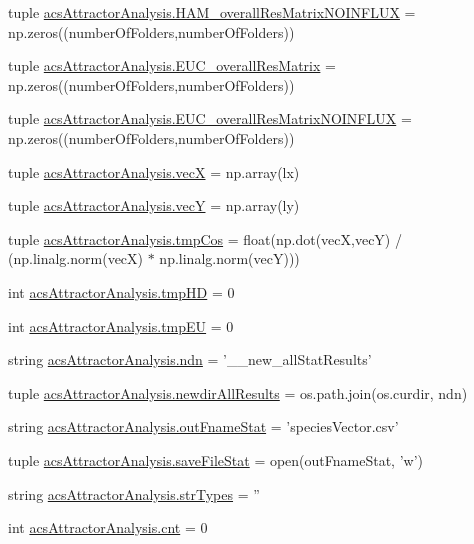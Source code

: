 \begin{DoxyCompactItemize}
\item 
tuple \hyperlink{a00122_a9aa1adb46370d97e4f38e7f09eb7a97c}{acs\-Attractor\-Analysis.\-H\-A\-M\-\_\-overall\-Res\-Matrix\-N\-O\-I\-N\-F\-L\-U\-X} = np.\-zeros((number\-Of\-Folders,number\-Of\-Folders))
\item 
tuple \hyperlink{a00122_a920167afed4efad8feefc27bdbadba89}{acs\-Attractor\-Analysis.\-E\-U\-C\-\_\-overall\-Res\-Matrix} = np.\-zeros((number\-Of\-Folders,number\-Of\-Folders))
\item 
tuple \hyperlink{a00122_a4214c876be4247f0643fc749beb35787}{acs\-Attractor\-Analysis.\-E\-U\-C\-\_\-overall\-Res\-Matrix\-N\-O\-I\-N\-F\-L\-U\-X} = np.\-zeros((number\-Of\-Folders,number\-Of\-Folders))
\item 
tuple \hyperlink{a00122_af20e9c92b7d977049b881882c0d1382c}{acs\-Attractor\-Analysis.\-vec\-X} = np.\-array(lx)
\item 
tuple \hyperlink{a00122_a691fb5bd87af2162b5acaf48ea4c06e7}{acs\-Attractor\-Analysis.\-vec\-Y} = np.\-array(ly)
\item 
tuple \hyperlink{a00122_a305669433b259c5ffcb797769e7c30df}{acs\-Attractor\-Analysis.\-tmp\-Cos} = float(np.\-dot(vec\-X,vec\-Y) / (np.\-linalg.\-norm(vec\-X) $\ast$ np.\-linalg.\-norm(vec\-Y)))
\item 
int \hyperlink{a00122_a1fe1582f1d1dc5f55558d25c8eb30ad7}{acs\-Attractor\-Analysis.\-tmp\-H\-D} = 0
\item 
int \hyperlink{a00122_a0c4860774229747cda9dabe70614abc6}{acs\-Attractor\-Analysis.\-tmp\-E\-U} = 0
\item 
string \hyperlink{a00122_a109ce3a379d650b3f9b08debc0433a19}{acs\-Attractor\-Analysis.\-ndn} = '\-\_\-\_\-new\-\_\-all\-Stat\-Results'
\item 
tuple \hyperlink{a00122_ae620f985669aed90dc070824420d4b5e}{acs\-Attractor\-Analysis.\-newdir\-All\-Results} = os.\-path.\-join(os.\-curdir, ndn)
\item 
string \hyperlink{a00122_aeecfcdefbc44b2b2ceff4c9b6f737f27}{acs\-Attractor\-Analysis.\-out\-Fname\-Stat} = 'species\-Vector.\-csv'
\item 
tuple \hyperlink{a00122_acc1016f353d0e1b36c837cb0b480edef}{acs\-Attractor\-Analysis.\-save\-File\-Stat} = open(out\-Fname\-Stat, 'w')
\item 
string \hyperlink{a00122_ae5f324ca114055fca79473eecd17bb80}{acs\-Attractor\-Analysis.\-str\-Types} = ''
\item 
int \hyperlink{a00122_a8ec106a228fafb4c290946a7b7f8b6da}{acs\-Attractor\-Analysis.\-cnt} = 0
\end{DoxyCompactItemize}
